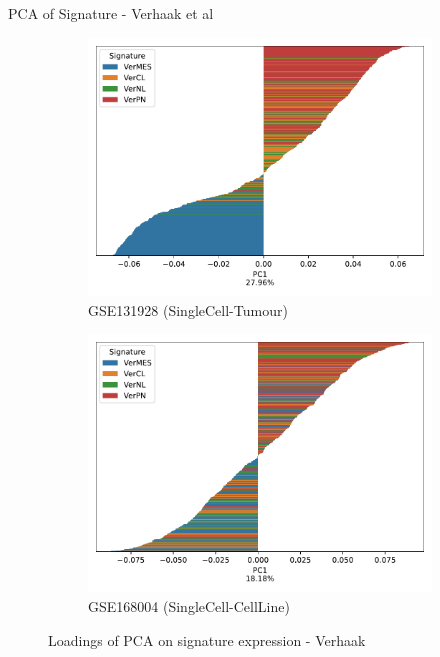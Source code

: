 \documentclass[aspectratio=169,9pt]{beamer}
\begin{document}
    \begin{frame}{PCA of Signature - Verhaak et al}
        \begin{adjustwidth}{-5cm}{-5cm}
            \centering
            \begin{figure}\ContinuedFloat
                \centering
                \begin{subfigure}[c]{0.48\textwidth}
                    \centering
                    \includegraphics[width=\textwidth]{GSM3828672_loadings_barplot_Ver}
                    \caption{GSE131928 (SingleCell-Tumour)}
                \end{subfigure}
                \begin{subfigure}[c]{0.48\textwidth}
                    \centering
                    \includegraphics[width=\textwidth]{mgg23_loadings_barplot_Ver}
                    \caption{GSE168004 (SingleCell-CellLine)}
                \end{subfigure}
                \caption{Loadings of PCA on signature expression - Verhaak}
            \end{figure}
        \end{adjustwidth}
    \end{frame}
\end{document}
